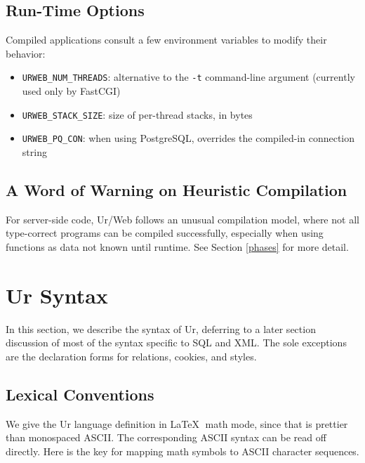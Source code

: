 \documentclass{article}
\newcommand{\cd}[1]{\texttt{#1}}
\begin{document}
\subsection{Run-Time Options}

Compiled applications consult a few environment variables to modify their behavior:

\begin{itemize}
  \item \cd{URWEB\_NUM\_THREADS}: alternative to the \cd{-t} command-line argument (currently used only by FastCGI)
  \item \cd{URWEB\_STACK\_SIZE}: size of per-thread stacks, in bytes
  \item \cd{URWEB\_PQ\_CON}: when using PostgreSQL, overrides the compiled-in connection string
\end{itemize}

\subsection{A Word of Warning on Heuristic Compilation}

For server-side code, Ur/Web follows an unusual compilation model, where not all type-correct programs can be compiled successfully, especially when using functions as data not known until runtime.  See Section \ref{phases} for more detail.


\section{Ur Syntax}

In this section, we describe the syntax of Ur, deferring to a later section discussion of most of the syntax specific to SQL and XML.  The sole exceptions are the declaration forms for relations, cookies, and styles.

\subsection{Lexical Conventions}

We give the Ur language definition in \LaTeX $\;$ math mode, since that is prettier than monospaced ASCII.  The corresponding ASCII syntax can be read off directly.  Here is the key for mapping math symbols to ASCII character sequences.
\end{document}
